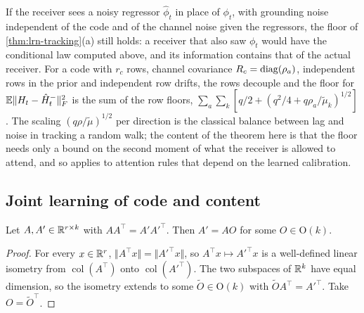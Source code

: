 \begin{remark}\label{rem:lrn-tracking-scope}
If the receiver sees a noisy regressor $\hat\phi_t$ in place of $\phi_t$, with grounding noise independent of the code and of the channel noise given the regressors, the floor of \cref{thm:lrn-tracking}(a) still holds: a receiver that also saw $\phi_t$ would have the conditional law computed above, and its information contains that of the actual receiver. For a code with $r_c$ rows, channel covariance $R_c=\operatorname{diag}(\rho_a)$, independent rows in the prior and independent row drifts, the rows decouple and the floor for $\mathbb{E}\Vert H_t-\hat H^-_t\Vert_F^2$ is the sum of the row floors, $\sum_a\sum_k[q/2+(q^2/4+q\rho_a/\tilde\mu_k)^{1/2}]$. The scaling $(q\rho/\tilde\mu)^{1/2}$ per direction is the classical balance between lag and noise in tracking a random walk; the content of the theorem here is that the floor needs only a bound on the second moment of what the receiver is allowed to attend, and so applies to attention rules that depend on the learned calibration.
\end{remark}

\subsection{Joint learning of code and content}

\begin{lemma}\label{lem:lrn-gram}
Let $A,A'\in\mathbb{R}^{r\times k}$ with $AA^\top=A'A'^\top$. Then $A'=AO$ for some $O\in\mathrm O(k)$.
\end{lemma}

\begin{proof}
For every $x\in\mathbb{R}^r$, $\Vert A^\top x\Vert=\Vert A'^\top x\Vert$, so $A^\top x\mapsto A'^\top x$ is a well-defined linear isometry from $\operatorname{col}(A^\top)$ onto $\operatorname{col}(A'^\top)$. The two subspaces of $\mathbb{R}^k$ have equal dimension, so the isometry extends to some $\tilde O\in\mathrm O(k)$ with $\tilde OA^\top=A'^\top$. Take $O=\tilde O^\top$.
\end{proof}

